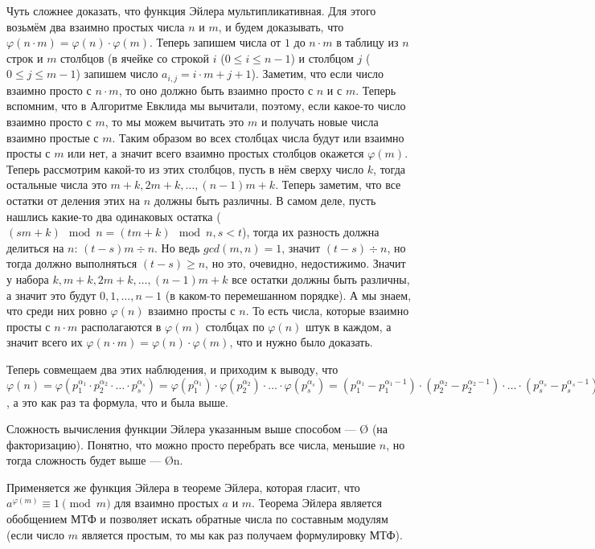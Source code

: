 Чуть сложнее доказать, что функция Эйлера мультипликативная. Для этого возьмём два взаимно простых числа $n$ и $m$, и будем доказывать, что $\varphi(n \cdot m) = \varphi(n) \cdot \varphi(m)$. Теперь запишем числа от $1$ до $n \cdot m$ в таблицу из $n$ строк и $m$ столбцов (в ячейке со строкой $i$ ($0 \leq i \leq n - 1$) и столбцом $j$ ($0 \leq j \leq m - 1$) запишем число $a_{i, j} = i \cdot m + j + 1$). Заметим, что если число взаимно просто с $n \cdot m$, то оно должно быть взаимно просто с $n$ и с $m$. Теперь вспомним, что в Алгоритме Евклида мы вычитали, поэтому, если какое-то число взаимно просто с $m$, то мы можем вычитать это $m$ и получать новые числа взаимно простые с $m$. Таким образом во всех столбцах числа будут или взаимно просты с $m$ или нет, а значит всего взаимно простых столбцов окажется $\varphi(m)$. Теперь рассмотрим какой-то из этих столбцов, пусть в нём сверху число $k$, тогда остальные числа это $m + k, 2m + k, \ldots, (n - 1)m + k$. Теперь заметим, что все остатки от деления этих на $n$ должны быть различны. В самом деле, пусть нашлись какие-то два одинаковых остатка ($(sm + k) \mod n = (tm + k) \mod n, s < t$), тогда их разность должна делиться на $n$: $(t - s)m \div n$. Но ведь $gcd(m, n) = 1$, значит $(t - s) \div n$, но тогда должно выполняться $(t - s) \geq n$, но это, очевидно, недостижимо. Значит у набора $k, m + k, 2m + k, \ldots, (n - 1)m + k$ все остатки должны быть различны, а значит это будут $0, 1, \ldots, n - 1$ (в каком-то перемешанном порядке). А мы знаем, что среди них ровно $\varphi(n)$ взаимно просты с $n$. То есть числа, которые взаимно просты с $n \cdot m$ располагаются в $\varphi(m)$ столбцах по $\varphi(n)$ штук в каждом, а значит всего их $\varphi(n \cdot m) = \varphi(n) \cdot \varphi(m)$, что и нужно было доказать.

Теперь совмещаем два этих наблюдения, и приходим к выводу, что $\varphi(n) = \varphi( p_1^{\alpha_1} \cdot p_2^{\alpha_2} \cdot \ldots \cdot p_s^{\alpha_s} ) = \varphi(p_1^{\alpha_1}) \cdot \varphi(p_2^{\alpha_2}) \cdot \ldots \cdot \varphi(p_s^{\alpha_s}) = (p_1^{\alpha_1} - p_1^{\alpha_1 - 1}) \cdot (p_2^{\alpha_2} - p_2^{\alpha_2 - 1}) \cdot \ldots \cdot (p_s^{\alpha_s} - p_s^{\alpha_s - 1})$, а это как раз та формула, что и была выше.

Сложность вычисления функции Эйлера указанным выше способом — \O{} (на факторизацию). Понятно, что можно просто перебрать все числа, меньшие $n$, но тогда сложность будет выше — \O{n}.

Применяется же функция Эйлера в теореме Эйлера, которая гласит, что $a^{\varphi(m)} \equiv 1 {\pmod{m}}$ для взаимно простых $a$ и $m$. Теорема Эйлера является обобщением МТФ и позволяет искать обратные числа по составным модулям (если число $m$ является простым, то мы как раз получаем формулировку МТФ).
